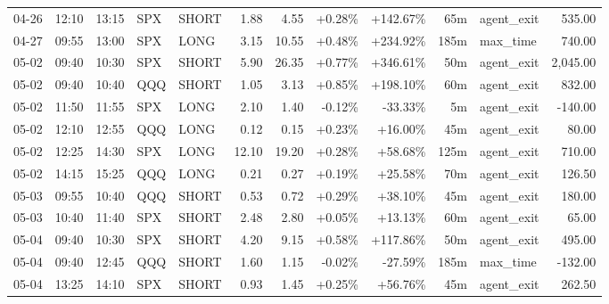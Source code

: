 \documentclass[11pt,a4paper,twoside]{article}
\begin{document}
\begin{center}
\begin{longtable}{>{\color{txtmain}}l l l l l r r r r r >{\color{txtmain}}l r}
04-26 & 12:10 & 13:15 & SPX & SHORT & 1.88 & 4.55 & \textcolor{wingreen}{+0.28\%} & \textcolor{wingreen}{+142.67\%} & 65m & agent\_exit & \textcolor{wingreen}{535.00} \\
04-27 & 09:55 & 13:00 & SPX & LONG & 3.15 & 10.55 & \textcolor{wingreen}{+0.48\%} & \textcolor{wingreen}{+234.92\%} & 185m & max\_time & \textcolor{wingreen}{740.00} \\
05-02 & 09:40 & 10:30 & SPX & SHORT & 5.90 & 26.35 & \textcolor{wingreen}{+0.77\%} & \textcolor{wingreen}{+346.61\%} & 50m & agent\_exit & \textcolor{wingreen}{2,045.00} \\
05-02 & 09:40 & 10:40 & QQQ & SHORT & 1.05 & 3.13 & \textcolor{wingreen}{+0.85\%} & \textcolor{wingreen}{+198.10\%} & 60m & agent\_exit & \textcolor{wingreen}{832.00} \\
05-02 & 11:50 & 11:55 & SPX & LONG & 2.10 & 1.40 & \textcolor{lossred}{-0.12\%} & \textcolor{lossred}{-33.33\%} & 5m & agent\_exit & \textcolor{lossred}{-140.00} \\
05-02 & 12:10 & 12:55 & QQQ & LONG & 0.12 & 0.15 & \textcolor{wingreen}{+0.23\%} & \textcolor{wingreen}{+16.00\%} & 45m & agent\_exit & \textcolor{wingreen}{80.00} \\
05-02 & 12:25 & 14:30 & SPX & LONG & 12.10 & 19.20 & \textcolor{wingreen}{+0.28\%} & \textcolor{wingreen}{+58.68\%} & 125m & agent\_exit & \textcolor{wingreen}{710.00} \\
05-02 & 14:15 & 15:25 & QQQ & LONG & 0.21 & 0.27 & \textcolor{wingreen}{+0.19\%} & \textcolor{wingreen}{+25.58\%} & 70m & agent\_exit & \textcolor{wingreen}{126.50} \\
05-03 & 09:55 & 10:40 & QQQ & SHORT & 0.53 & 0.72 & \textcolor{wingreen}{+0.29\%} & \textcolor{wingreen}{+38.10\%} & 45m & agent\_exit & \textcolor{wingreen}{180.00} \\
05-03 & 10:40 & 11:40 & SPX & SHORT & 2.48 & 2.80 & \textcolor{wingreen}{+0.05\%} & \textcolor{wingreen}{+13.13\%} & 60m & agent\_exit & \textcolor{wingreen}{65.00} \\
05-04 & 09:40 & 10:30 & SPX & SHORT & 4.20 & 9.15 & \textcolor{wingreen}{+0.58\%} & \textcolor{wingreen}{+117.86\%} & 50m & agent\_exit & \textcolor{wingreen}{495.00} \\
05-04 & 09:40 & 12:45 & QQQ & SHORT & 1.60 & 1.15 & \textcolor{lossred}{-0.02\%} & \textcolor{lossred}{-27.59\%} & 185m & max\_time & \textcolor{lossred}{-132.00} \\
05-04 & 13:25 & 14:10 & SPX & SHORT & 0.93 & 1.45 & \textcolor{wingreen}{+0.25\%} & \textcolor{wingreen}{+56.76\%} & 45m & agent\_exit & \textcolor{wingreen}{262.50} \\

\end{longtable}
\end{center}
\end{document}
